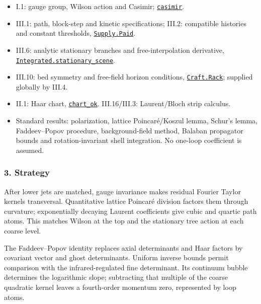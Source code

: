 \documentclass[
  letterpaper,
  11pt]{article}
\providecommand{\tightlist}{%
  \setlength{\itemsep}{0pt}\setlength{\parskip}{0pt}}
\begin{document}
\begin{itemize}
\tightlist
\item
  I.1: gauge group, Wilson action and Casimir;
  \href{https://github.com/yang-mills-group/OpenAI-YM-20261028/blob/3456e5e75cf8d4cd558955a5c7638fba2d68f464/YM/Gauge/Colors.lean\#L180-L182}{\texttt{casimir}}.
\item
  III.1: path, block-step and kinetic specifications; III.2: compatible
  histories and constant thresholds,
  \href{https://github.com/yang-mills-group/OpenAI-YM-20261028/blob/3456e5e75cf8d4cd558955a5c7638fba2d68f464/YM/Price/Intent.lean\#L145-L162}{\texttt{Supply.Paid}}.
\item
  III.6: analytic stationary branches and free-interpolation derivative,
  \href{https://github.com/yang-mills-group/OpenAI-YM-20261028/blob/3456e5e75cf8d4cd558955a5c7638fba2d68f464/YM/Integrated.lean\#L229-L232}{\texttt{Integrated.stationary\_scene}}.
\item
  III.10: bed symmetry and free-field horizon conditions,
  \href{https://github.com/yang-mills-group/OpenAI-YM-20261028/blob/3456e5e75cf8d4cd558955a5c7638fba2d68f464/YM/Bid/Craft.lean\#L63-L73}{\texttt{Craft.Rack}};
  supplied globally by III.4.
\item
  II.1: Haar chart,
  \href{https://github.com/yang-mills-group/OpenAI-YM-20261028/blob/3456e5e75cf8d4cd558955a5c7638fba2d68f464/YM/Next/FOUNDATIONS/Primary.lean\#L84}{\texttt{chart\_ok}}.
  III.16/III.3: Laurent/Bloch strip calculus.
\item
  Standard results: polarization, lattice Poincaré/Koszul lemma, Schur's
  lemma, Faddeev--Popov procedure, background-field method, Balaban
  propagator bounds and rotation-invariant shell integration. No
  one-loop coefficient is assumed.
\end{itemize}

\subsubsection{3. Strategy}\label{strategy-9}

After lower jets are matched, gauge invariance makes residual Fourier
Taylor kernels transversal. Quantitative lattice Poincaré division
factors them through curvature; exponentially decaying Laurent
coefficients give cubic and quartic path atoms. This matches Wilson at
the top and the stationary tree action at each coarse level.

The Faddeev--Popov identity replaces axial determinants and Haar factors
by covariant vector and ghost determinants. Uniform inverse bounds
permit comparison with the infrared-regulated fine determinant. Its
continuum bubble determines the logarithmic slope; subtracting that
multiple of the coarse quadratic kernel leaves a fourth-order momentum
zero, represented by loop atoms.
\end{document}
